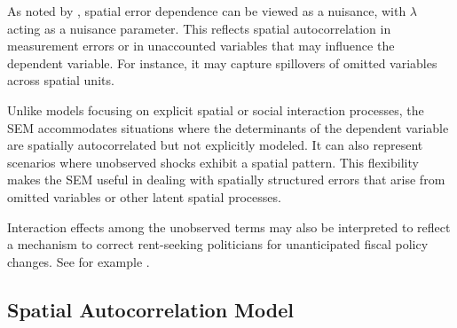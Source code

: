 \documentclass[english,12pt]{book}\usepackage[]{graphicx}\usepackage[]{xcolor}
\begin{document}
As noted by \cite{AnselinBera1998}, spatial error dependence can be viewed as a nuisance, with $\lambda$ acting as a nuisance parameter. This reflects spatial autocorrelation in measurement errors or in unaccounted variables that may influence the dependent variable. For instance, it may capture spillovers of omitted variables across spatial units.

Unlike models focusing on explicit spatial or social interaction processes, the SEM accommodates situations where the determinants of the dependent variable are spatially autocorrelated but not explicitly modeled. It can also represent scenarios where unobserved shocks exhibit a spatial pattern. This flexibility makes the SEM useful in dealing with spatially structured errors that arise from omitted variables or other latent spatial processes.
% 
% 
% 

\begin{remark}
Interaction effects among the unobserved terms may also be interpreted to reflect a mechanism to correct rent-seeking politicians for unanticipated fiscal policy changes. See for example \cite{allers2005tax}.
\end{remark}

\subsection{Spatial Autocorrelation Model}
\end{document}
